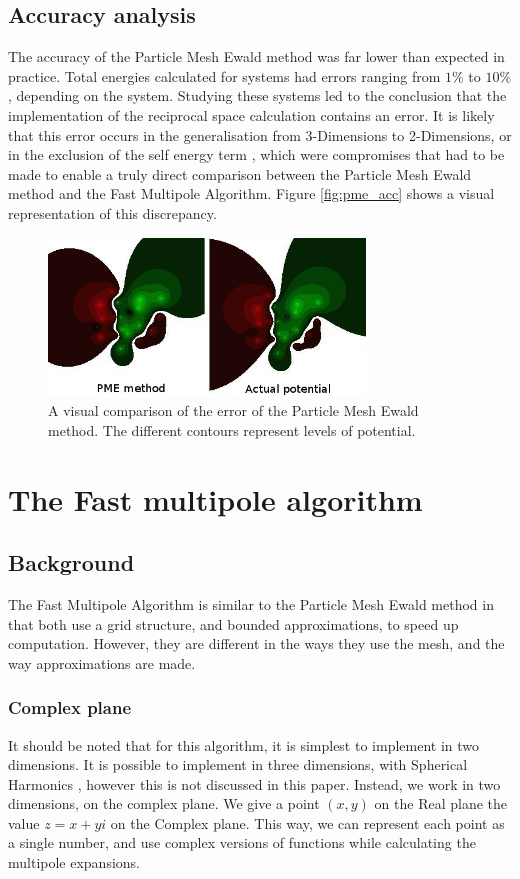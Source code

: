 \documentclass[pdftex,twoside,a4paper]{report}
\newcommand{\bcen}{\begin{center}}
\newcommand{\ecen}{\end{center}}
\newcommand{\pmem}{Particle Mesh Ewald method}
\newcommand{\fma}{Fast Multipole Algorithm}
\begin{document}
\subsection{Accuracy analysis}
The accuracy of the \pmem{} was far lower than expected in practice. Total energies calculated for systems had errors ranging from $1\%$ to $10\%$, depending on the system. Studying these systems led to the conclusion that the implementation of the reciprocal space calculation contains an error. It is likely that this error occurs in the generalisation from 3-Dimensions to 2-Dimensions, or in the exclusion of the self energy term \cite{essmann:8577}, which were compromises that had to be made to enable a truly direct comparison between the \pmem{} and the \fma{}. Figure \ref{fig:pme_acc} shows a visual representation of this discrepancy.
\begin{figure}
\bcen \includegraphics[width=0.75\textwidth]{figures/PMEscreenshot.jpg} \ecen
\caption{A visual comparison of the error of the \pmem{}. The different contours represent levels of potential.}
\label{fig:fig:pme_acc}
\end{figure}
\section{The Fast multipole algorithm}
\subsection{Background}
The \fma{} is similar to the \pmem{} in that both use a grid structure, and bounded approximations, to speed up computation. However, they are different in the ways they use the mesh, and the way approximations are made.
\subsubsection{Complex plane}
It should be noted that for this algorithm, it is simplest to implement in two dimensions. It is possible to implement in three dimensions, with Spherical Harmonics \cite{Ihler04}, however this is not discussed in this paper. Instead, we work in two dimensions, on the complex plane. We give a point $(x,y)$ on the Real plane the value $z = x + yi$ on the Complex plane. This way, we can represent each point as a single number, and use complex versions of functions while calculating the multipole expansions.
\end{document}
